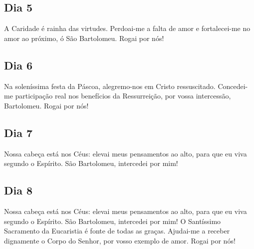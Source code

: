 \documentclass[18pt]{article}
\begin{document}
\begin{justify}
\begin{center}
  \subsection*{Dia 5}
\end{center}


A Caridade é rainha das virtudes. Perdoai-me a falta de amor e fortalecei-me no amor ao próximo, ó São Bartolomeu. Rogai por nós!

\begin{center}
  \subsection*{Dia 6}
\end{center}




Na soleníssima festa da Páscoa, alegremo-nos em Cristo ressuscitado. Concedei-me participação real nos benefícios da Ressurreição, por vossa intercessão, Bartolomeu. Rogai por nós!

\begin{center}
  \subsection*{Dia 7}
\end{center}



Nossa cabeça está nos Céus: elevai meus pensamentos ao alto, para que eu viva segundo o Espírito. São Bartolomeu, intercedei por mim!

\begin{center}
  \subsection*{Dia 8}
\end{center}



Nossa cabeça está nos Céus: elevai meus pensamentos ao alto, para que eu viva segundo o Espírito. São Bartolomeu, intercedei por mim!
O Santíssimo Sacramento da Eucaristia é fonte de todas as graças. Ajudai-me a receber dignamente o Corpo do Senhor, por vosso exemplo de amor. Rogai por nós!

\newpage


\end{justify}
\end{document}
